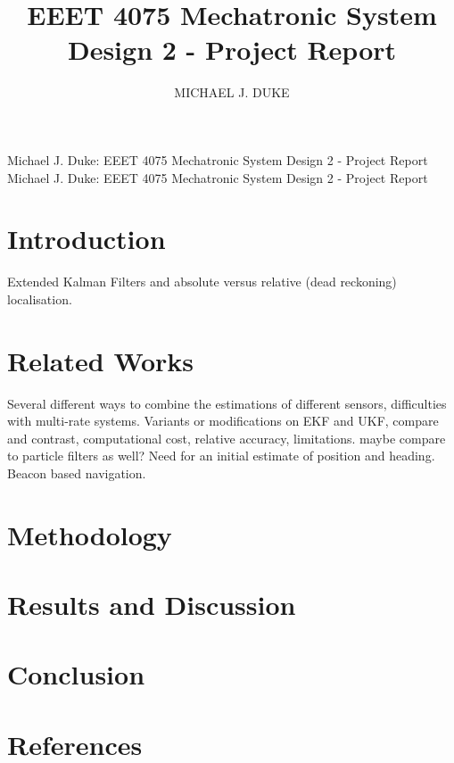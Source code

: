 \documentclass{ieeeaccess}
\begin{document}

\title{EEET 4075 Mechatronic System Design 2 - Project Report}
\author{\uppercase{Michael J. Duke}}
\address[1]{University of South Australia, Mawson Lakes, SA 5095 Australia (e-mail: dukmj002@mymail.unisa.edu.au)}

\markboth
{Michael J. Duke: EEET 4075 Mechatronic System Design 2 - Project Report}
{Michael J. Duke: EEET 4075 Mechatronic System Design 2 - Project Report}

\titlepgskip=-15pt

\maketitle

\section{Introduction}
\label{sec:introduction}
 Extended Kalman Filters and absolute versus relative (dead reckoning) localisation.

\section{Related Works}
\label{sec:rel}
Several different ways to combine the estimations of different sensors, difficulties with multi-rate systems. Variants or modifications on EKF and UKF, compare and contrast, computational cost, relative accuracy, limitations. maybe compare to particle filters as well? Need for an initial estimate of position and heading. Beacon based navigation.

\section{Methodology}
\label{sec:meth}


\section{Results and Discussion}
\label{sec:res}


\section{Conclusion}
\label{sec:con}


\section{References}

\EOD
\end{document}
